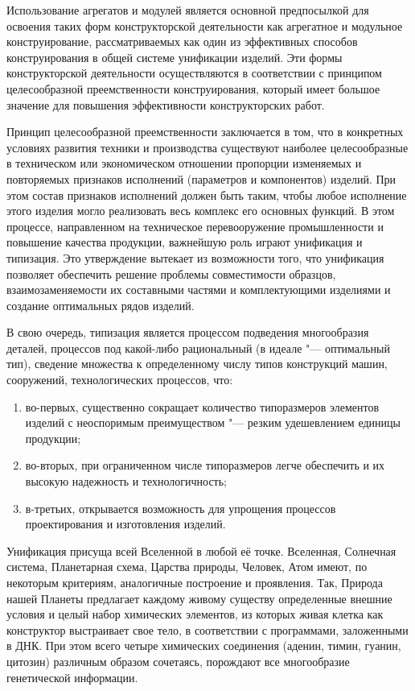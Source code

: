 Использование агрегатов и модулей является основной предпосылкой для освоения таких форм конструкторской деятельности как агрегатное и модульное конструирование, рассматриваемых как один из эффективных способов конструирования в общей системе унификации изделий. Эти формы конструкторской деятельности осуществляются в соответствии с принципом целесообразной преемственности конструирования, который имеет большое значение для повышения эффективности конструкторских работ.

Принцип целесообразной преемственности заключается в том, что в конкретных условиях развития техники и производства существуют наиболее целесообразные в техническом или экономическом отношении пропорции изменяемых и повторяемых признаков исполнений (параметров и компонентов) изделий. При этом состав признаков исполнений должен быть таким, чтобы любое исполнение этого изделия могло реализовать весь комплекс его основных функций. В этом процессе, направленном на техническое перевооружение промышленности и повышение качества продукции, важнейшую роль играют унификация и типизация. Это утверждение вытекает из возможности того, что унификация позволяет обеспечить решение проблемы совместимости образцов, взаимозаменяемости их составными частями и комплектующими изделиями и создание оптимальных рядов изделий.

В свою очередь, типизация является процессом подведения многообразия деталей, процессов под какой-либо рациональный (в идеале "--- оптимальный тип), сведение множества к определенному числу типов конструкций машин, сооружений, технологических процессов, что:

\begin{enumerate}
	\item во-первых, существенно сокращает количество типоразмеров элементов изделий с неоспоримым преимуществом "--- резким удешевлением единицы продукции;
	\item во-вторых, при ограниченном числе типоразмеров легче обеспечить и их высокую надежность и технологичность;
	\item в-третьих, открывается возможность для упрощения процессов проектирования и изготовления изделий.
\end{enumerate}

Унификация присуща всей Вселенной в любой её точке. Вселенная, Солнечная система, Планетарная схема, Царства природы, Человек, Атом имеют, по некоторым критериям, аналогичные построение и проявления. Так, Природа нашей Планеты предлагает каждому живому существу определенные внешние условия и целый набор химических элементов, из которых живая клетка как конструктор выстраивает свое тело, в соответствии с программами, заложенными в ДНК. При этом всего четыре химических соединения (аденин, тимин, гуанин, цитозин) различным образом сочетаясь, порождают все многообразие генетической информации.

